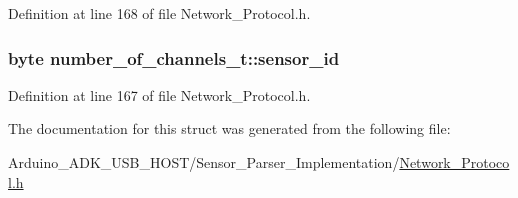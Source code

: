 Definition at line 168 of file Network\-\_\-\-Protocol.\-h.

\hypertarget{structnumber__of__channels__t_a1bcf45943ede04abfe8eb0d8900a1f48}{
\subsubsection[{sensor\-\_\-id}]{\setlength{\rightskip}{0pt plus 5cm}byte number\-\_\-of\-\_\-channels\-\_\-t\-::sensor\-\_\-id}}\label{structnumber__of__channels__t_a1bcf45943ede04abfe8eb0d8900a1f48}


Definition at line 167 of file Network\-\_\-\-Protocol.\-h.



The documentation for this struct was generated from the following file\-:\begin{DoxyCompactItemize}
\item 
Arduino\-\_\-\-A\-D\-K\-\_\-\-U\-S\-B\-\_\-\-H\-O\-S\-T/\-Sensor\-\_\-\-Parser\-\_\-\-Implementation/\hyperlink{_network___protocol_8h}{Network\-\_\-\-Protocol.\-h}\end{DoxyCompactItemize}
